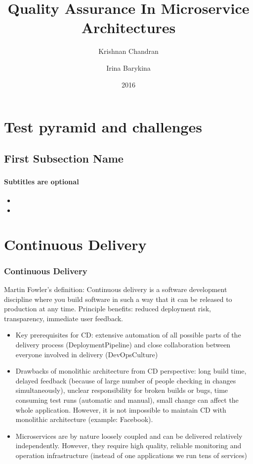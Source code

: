 \documentclass{beamer}
\title{Quality Assurance In Microservice Architectures}
\author{Krishnan Chandran \and Irina Barykina}
\institute[NYU]
{
Department of Informatics,\\
Intelligent Adaptive Systems, UHH\\
}
\date{2016}
\begin{document}
\begin{frame}
\titlepage
\end{frame}


\section{Test pyramid and challenges}
\subsection[Short First Subsection Name]{First Subsection Name}

\begin{frame}
	\frametitle{}	
	\framesubtitle{Subtitles are optional}

	\begin{itemize}
 		 \item
		 \item
	\end{itemize}
\end{frame}


\section{Continuous Delivery}
\begin{frame}
	\frametitle{Continuous Delivery} 
	\begin{block}{Martin Fowler's definition:}
		 Continuous delivery is a software development discipline where you build software in such a way that it can be released to production at any time. Principle benefits: reduced deployment risk, transparency, immediate user feedback.	
	\end{block}
	\begin{itemize}
		 \item Key prerequisites for CD: extensive automation of all possible parts of the delivery process (DeploymentPipeline) and close collaboration between everyone involved in delivery (DevOpsCulture) 
  		 \item Drawbacks of monolithic architecture from CD perspective: long build time, delayed feedback (because of large number of people checking in changes simultaneously), unclear responsibility for broken builds or bugs, time consuming test runs (automatic and manual), small change can affect the whole application. However, it is not impossible to maintain CD with monolithic architecture (example: Facebook).
                 \item Microservices are by nature loosely coupled and can be delivered relatively independently. However, they require high quality, reliable monitoring and operation infrastructure (instead of one applications we run tens of services)
	\end{itemize}
\end{frame}
\end{document}
